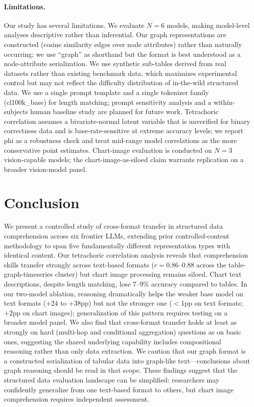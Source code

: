\documentclass[11pt]{article}
\begin{document}
\paragraph{Limitations.} Our study has several limitations. We evaluate $N{=}6$ models, making model-level analyses descriptive rather than inferential. Our graph representations are constructed (cosine similarity edges over node attributes) rather than naturally occurring; we use ``graph'' as shorthand but the format is best understood as a node-attribute serialization. We use synthetic sub-tables derived from real datasets rather than existing benchmark data, which maximizes experimental control but may not reflect the difficulty distribution of in-the-wild structured data. We use a single prompt template and a single tokenizer family (cl100k\_base) for length matching; prompt sensitivity analysis and a within-subjects human baseline study are planned for future work. Tetrachoric correlation assumes a bivariate-normal latent variable that is unverified for binary correctness data and is base-rate-sensitive at extreme accuracy levels; we report phi as a robustness check and treat mid-range model correlations as the more conservative point estimates. Chart-image evaluation is conducted on $N{=}3$ vision-capable models; the chart-image-as-siloed claim warrants replication on a broader vision-model panel.

\section{Conclusion}

We present a controlled study of cross-format transfer in structured data comprehension across six frontier LLMs, extending prior controlled-content methodology to span five fundamentally different representation types with identical content. Our tetrachoric correlation analysis reveals that comprehension skills transfer strongly across text-based formats ($r{=}0.86$--0.88 across the table-graph-timeseries cluster) but chart image processing remains siloed. Chart text descriptions, despite length matching, lose 7--9\% accuracy compared to tables. In our two-model ablation, reasoning dramatically helps the weaker base model on text formats ($+24$ to $+38$pp) but not the stronger one ($<$1pp on text formats; $+2$pp on chart images); generalization of this pattern requires testing on a broader model panel. We also find that cross-format transfer holds at least as strongly on hard (multi-hop and conditional aggregation) questions as on basic ones, suggesting the shared underlying capability includes compositional reasoning rather than only data extraction. We caution that our graph format is a constructed serialization of tabular data into graph-like text---conclusions about graph reasoning should be read in that scope. These findings suggest that the structured data evaluation landscape can be simplified: researchers may confidently generalize from one text-based format to others, but chart image comprehension requires independent assessment.
\end{document}
